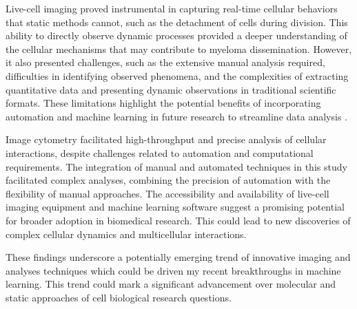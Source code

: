 Live-cell imaging proved instrumental in capturing real-time cellular behaviors
that static methods cannot, such as the detachment of \INA cells during
division. This ability to directly observe dynamic processes provided a deeper
understanding of the cellular mechanisms that may contribute to myeloma
dissemination.  However, it also presented challenges, such as the extensive
manual analysis required, difficulties in identifying observed phenomena, and
the complexities of extracting quantitative data and presenting dynamic
observations in traditional scientific formats. These limitations highlight the
potential benefits of incorporating automation and machine learning in future
research to streamline data analysis \cite{guptaDeepLearningImage2019,
    chengFrontiersDevelopmentLivecell2023}.

Image cytometry facilitated high-throughput and precise analysis of cellular
interactions, despite challenges related to automation and computational
requirements. The integration of manual and automated techniques in this study
facilitated complex analyses, combining the precision of automation with the
flexibility of manual approaches. The accessibility and availability of
live-cell imaging equipment and machine learning software suggest a promising
potential for broader adoption in biomedical research. This could lead to new
discoveries of complex cellular dynamics and multicellular interactions.

These findings underscore a potentially emerging trend of innovative imaging and
analyses techniques which could be driven my recent breakthroughs in machine
learning. This trend could mark a significant advancement over molecular
and static approaches of cell biological research questions.







